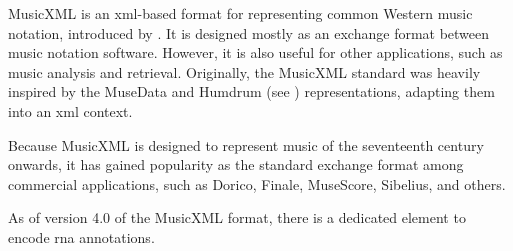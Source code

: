 


MusicXML is an \gls{xml}-based format for representing
common Western music notation, introduced by
\textcite{good2001musicxml}. It is designed mostly as an
exchange format between music notation software. However, it
is also useful for other applications, such as music
analysis and retrieval. Originally, the MusicXML standard
was heavily inspired by the MuseData and Humdrum (see
) representations, adapting
them into an \gls{xml} context.



Because MusicXML is designed to represent music of the
seventeenth century onwards, it has gained popularity as the
standard exchange format among commercial applications, such
as Dorico,
Finale,
MuseScore,
Sibelius, and
others.



As of version 4.0 of the MusicXML format, there is a dedicated  element to encode \gls{rna} annotations.
